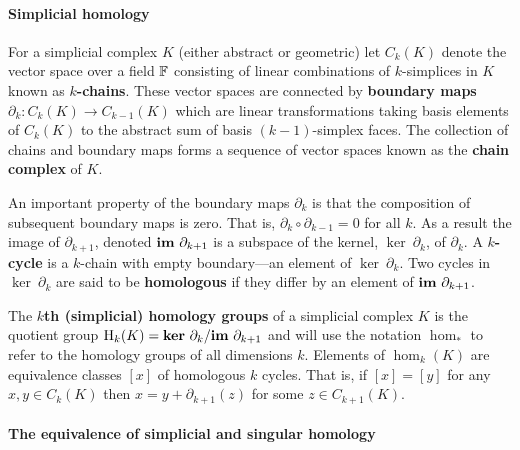 
\paragraph{Simplicial homology}

For a simplicial complex $K$ (either abstract or geometric) let $C_k(K)$ denote the vector space over a field $\mathbb{F}$ consisting of linear combinations of $k$-simplices in $K$ known as \textbf{$k$-chains}.
These vector spaces are connected by \textbf{boundary maps} $\partial_k: C_k(K)\to C_{k-1}(K)$ which are linear transformations taking basis elements of $C_k(K)$ to the abstract sum of basis $(k-1)$-simplex faces.
The collection of chains and boundary maps forms a sequence of vector spaces known as the \textbf{chain complex} of $K$.

An important property of the boundary maps $\partial_k$ is that the composition of subsequent boundary maps is zero.
That is, $\partial_k\circ\partial_{k-1} = 0$ for all $k$.
As a result the image of $\partial_{k+1}$, denoted $\mathbf{im}~\partial_{k+1}$ is a subspace of the kernel, $\ker~\partial_k$, of $\partial_k$.
A \textbf{$k$-cycle} is a $k$-chain with empty boundary---an element of $\ker~\partial_k$.
Two cycles in $\ker~\partial_k$ are said to be \textbf{homologous} if they differ by an element of $\mathbf{im}~\partial_{k+1}$.

The \textbf{$k$th (simplicial) homology groups} of a simplicial complex $K$ is the quotient group $\mathrm{H}_k(K) = \mathbf{ker}~\partial_k/\mathbf{im}~\partial_{k+1}$ and will use the notation $\hom_*$ to refer to the homology groups of all dimensions $k$.
Elements of $\hom_k(K)$ are equivalence classes $[x]$ of homologous $k$ cycles.
That is, if $[x] = [y]$ for any $x,y\in C_k(K)$ then $x = y +\partial_{k+1}(z)$ for some $z\in C_{k+1}(K)$.

\paragraph{The equivalence of simplicial and singular homology}

